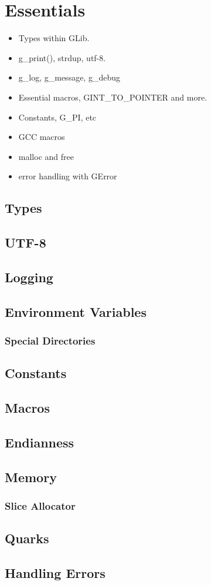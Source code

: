 \chapter{Essentials}

\begin{itemize}
\item Types within GLib.
\item g\_print(), strdup, utf-8.
\item g\_log, g\_message, g\_debug
\item Essential macros, GINT\_TO\_POINTER and more.
\item Constants, G\_PI, etc
\item GCC macros
\item malloc and free
\item error handling with GError
\end{itemize}

\section{Types}

\section{UTF-8}

\section{Logging}

\section{Environment Variables}
\subsection{Special Directories}

\section{Constants}

\section{Macros}

\section{Endianness}

\section{Memory}
\subsection{Slice Allocator}

\section{Quarks}

\section{Handling Errors}

